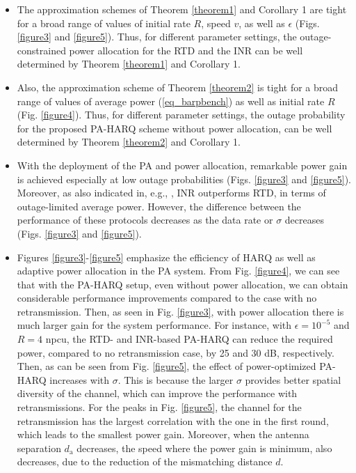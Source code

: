 \begin{itemize}
    \item The approximation schemes of Theorem \ref{theorem1} and Corollary 1 are  tight for a broad range of values of initial rate $R$, speed $v$,  as well as $\epsilon$ (Figs. \ref{figure3} and \ref{figure5}). Thus, for different parameter settings, the outage-constrained power allocation for the RTD and the INR can be well determined by Theorem \ref{theorem1} and Corollary 1. 
    \item Also, the approximation scheme of Theorem \ref{theorem2} is tight for a broad range of values of average power (\ref{eq_barpbench}) as well as initial rate $R$ (Fig. \ref{figure4}). Thus, for different parameter settings, the outage probability for the proposed PA-HARQ scheme without power allocation, can be well determined by Theorem \ref{theorem2} and Corollary 1.
    \item With the deployment of the PA and power allocation, remarkable power gain is achieved especially at low outage probabilities  (Figs. \ref{figure3} and \ref{figure5}). Moreover,  as also indicated in, e.g.,  \cite{makki2014green}, INR outperforms RTD, in terms of outage-limited average power. However, the difference between the performance of these protocols decreases as the data rate or $\sigma$ decreases (Figs. \ref{figure3} and \ref{figure5}).
    \item Figures \ref{figure3}-\ref{figure5} emphasize the efficiency of HARQ as well as adaptive power allocation in the PA system. From Fig. \ref{figure4}, we can see that with the PA-HARQ setup, even without power allocation, we can obtain considerable performance improvements compared to the case with no retransmission. Then, as seen in Fig. \ref{figure3}, with power allocation there is much larger gain for the system performance. For instance, with $\epsilon=10^{-5}$ and $R = 4$ npcu, the RTD- and INR-based PA-HARQ can reduce the required power, compared to no retransmission case, by 25 and 30 dB, respectively. Then, as can be seen from Fig.  \ref{figure5}, the effect of power-optimized PA-HARQ increases with $\sigma$. This is because the larger $\sigma$ provides better spatial diversity of the channel, which can improve the performance with retransmissions. For the peaks in Fig. \ref{figure5}, the channel for the retransmission has the largest correlation with the one in the first round, which leads to the smallest power gain. Moreover, when the antenna separation $d_\text{a}$ decreases, the speed where the power gain is minimum, also decreases, due to the reduction of the mismatching distance $d$.
\end{itemize}



